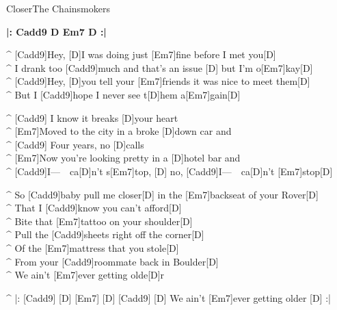 \begin{song}{Closer}{The Chainsmokers}

\begin{guitar}
\textbf{|: Cadd9 D Em7 D :|}\\
\end{guitar}

\begin{guitar}
^ [Cadd9]Hey,   [D]I was doing just [Em7]fine before I met you[D]\\
^ I drank too [Cadd9]much and that's an issue [D] but I'm o[Em7]kay[D]\\
^ [Cadd9]Hey,   [D]you tell your [Em7]friends it was nice to meet them[D]\\
^ But I [Cadd9]hope I never see t[D]hem a[Em7]gain[D]\\
\end{guitar}

\begin{guitar}
^ [Cadd9]   I know it breaks [D]your heart\\
^ [Em7]Moved to the city in a broke [D]down car and\\
^ [Cadd9]   Four years, no [D]calls\\
^ [Em7]Now you're looking pretty in a [D]hotel bar and\\
^ [Cadd9]I---\ \ ca[D]n't s[Em7]top, [D]   no, [Cadd9]I---\ \  ca[D]n't [Em7]stop[D]\\
\end{guitar}

\begin{guitar}
^ So [Cadd9]baby pull me closer[D] in the [Em7]backseat of your Rover[D]\\
^ That I [Cadd9]know you can't afford[D]\\
^ Bite that [Em7]tattoo on your shoulder[D]\\
^ Pull the [Cadd9]sheets right off the corner[D]\\
^ Of the [Em7]mattress that you stole[D]\\
^ From your [Cadd9]roommate back in Boulder[D]\\
^ We ain't [Em7]ever getting olde[D]r\\
\end{guitar}

\begin{guitar}
^ |: [Cadd9]      [D]  [Em7]    [D]  [Cadd9]       [D] We ain't [Em7]ever getting older [D]   :|\\
\end{guitar}



\end{song}
